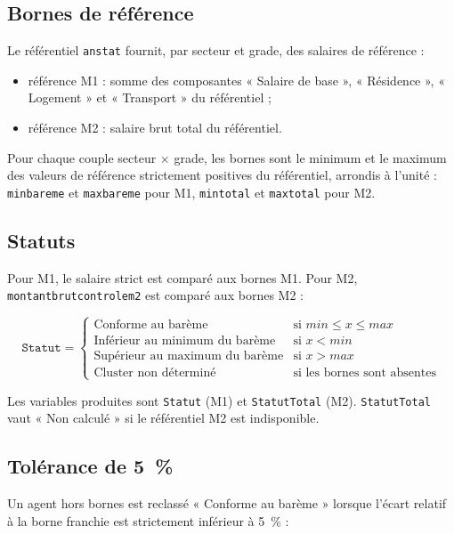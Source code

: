 \documentclass[12pt,a4paper,french]{article}
\renewcommand{\_}{\underscoreorigine\allowbreak}
\begin{document}
\subsection{Bornes de référence}

Le référentiel \texttt{anstat\_2025} fournit, par secteur et grade, des salaires de référence :

\begin{itemize}
    \item référence M1 : somme des composantes « Salaire de base », « Résidence », « Logement » et « Transport » du référentiel ;
    \item référence M2 : salaire brut total du référentiel.
\end{itemize}

Pour chaque couple secteur $\times$ grade, les bornes sont le minimum et le maximum des valeurs de référence strictement positives du référentiel, arrondis à l'unité : \texttt{min\_bareme} et \texttt{max\_bareme} pour M1, \texttt{min\_total} et \texttt{max\_total} pour M2.

\subsection{Statuts}

Pour M1, le salaire strict est comparé aux bornes M1. Pour M2, \texttt{montant\_brut\_controle\_m2} est comparé aux bornes M2 :

\[
\texttt{Statut} =
\begin{cases}
\text{Conforme au barème} & \text{si } min \leq x \leq max \\
\text{Inférieur au minimum du barème} & \text{si } x < min \\
\text{Supérieur au maximum du barème} & \text{si } x > max \\
\text{Cluster non déterminé} & \text{si les bornes sont absentes}
\end{cases}
\]

Les variables produites sont \texttt{Statut} (M1) et \texttt{Statut\_Total} (M2). \texttt{Statut\_Total} vaut « Non calculé » si le référentiel M2 est indisponible.

\subsection{Tolérance de 5~\%}

Un agent hors bornes est reclassé « Conforme au barème » lorsque l'écart relatif à la borne franchie est strictement inférieur à 5~\% :
\end{document}
